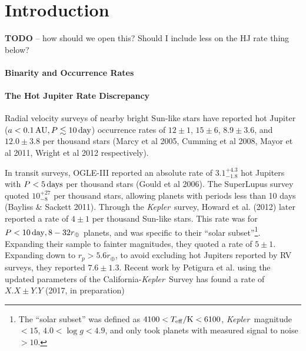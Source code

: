 \section{Introduction}

{\bf TODO} -- how should we open this? Should I include less on the HJ rate 
thing below?

\paragraph{Binarity and Occurrence Rates}



\paragraph{The Hot Jupiter Rate Discrepancy}

Radial velocity surveys of nearby bright Sun-like stars have reported hot 
Jupiter ($a<0.1\,{\rm AU}, P\lesssim 10\,{\rm day}$) occurrence rates of
$12\pm 1$, $15\pm 6$, $8.9 \pm 3.6$, and $12.0 \pm 3.8$ per thousand stars
(Marcy et al 2005, Cumming et al 2008, Mayor et al 2011, Wright et al 2012 
respectively).

In transit surveys, OGLE-III reported an absolute rate of $3.1^{+ 
4.3}_{-1.8}$ hot Jupiters with $P<5\,{\rm days}$ per thousand stars (Gould et 
al 2006).
The SuperLupus survey quoted $10^{+27}_{-8}$ per thousand stars, allowing 
planets with periods less than 10 days (Bayliss \& Sackett 2011).
Through the {\it Kepler}\ survey, Howard et al. (2012) later reported a rate 
of 
$4 \pm 1$ per thousand Sun-like stars.
This rate was for $P<10\,{\rm day}, 8-32r_\oplus$ planets, and 
was specific to their ``solar subset''\footnote{The ``solar subset'' was 
defined as $4100<T_{\rm eff}/{\rm K}<6100$, {\it Kepler}\ 
magnitude $<15$, $4.0 < \log g < 4.9$, and only took planets with measured 
signal to noise $>10$.
}.
Expanding their sample to fainter magnitudes, they quoted a rate of $5 \pm 
1$.
Expanding down to $r_p>5.6r_\oplus$, to avoid excluding hot Jupiters reported 
by RV surveys, they reported $7.6 \pm 1.3$.
Recent work by Petigura et al. using the updated parameters of the 
California-{\it Kepler}\ Survey has found a rate of $X.X \pm 
Y.Y$ (2017, in preparation)

